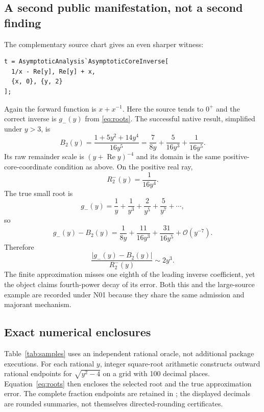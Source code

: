 \documentclass[11pt,letterpaper]{article}
\theoremstyle{remark}\newtheorem{remark}[theorem]{Remark}
\newcommand{\file}[1]{\path{#1}}
\newcommand{\OO}[1]{\mathcal O\!\left(#1\right)}
\begin{document}
\subsection{A second public manifestation, not a second finding}
The complementary source chart gives an even sharper witness:
\begin{lstlisting}
t = AsymptoticAnalysis`AsymptoticCoreInverse[
  1/x - Re[y], Re[y] + x,
  {x, 0}, {y, 2}
];
\end{lstlisting}
Again the forward function is $x+x^{-1}$. Here the source tends to $0^+$ and
the correct inverse is $g_-(y)$ from \eqref{eq:roots}. The successful native
result, simplified under $y>3$, is
\begin{equation}\label{eq:smallobserved}
 B_2(y)=\frac{1+5y^2+14y^4}{16y^5}
       =\frac7{8y}+\frac5{16y^3}+\frac1{16y^5}.
\end{equation}
Its raw remainder scale is $(y+\operatorname{Re}y)^{-4}$ and its domain is the
same positive-core-coordinate condition as above. On the positive real ray,
\begin{equation}\label{eq:smallscale}
 R_2^-(y)=\frac1{16y^4}.
\end{equation}
The true small root is
\[
 g_-(y)=\frac1y+\frac1{y^3}+\frac2{y^5}+\frac5{y^7}+\cdots,
\]
so
\begin{equation}\label{eq:smallerror}
 g_-(y)-B_2(y)=\frac1{8y}+\frac{11}{16y^3}
                    +\frac{31}{16y^5}+\OO{y^{-7}}.
\end{equation}
Therefore
\begin{equation}\label{eq:smallratio}
 \frac{|g_-(y)-B_2(y)|}{R_2^-(y)}\sim 2y^3.
\end{equation}
The finite approximation misses one eighth of the leading inverse coefficient,
yet the object claims fourth-power decay of its error. Both this and the
large-source example are recorded under N01 because they share the same
admission and majorant mechanism.

\subsection{Exact numerical enclosures}
Table~\ref{tab:samples} uses an independent rational oracle, not additional
package executions. For each rational $y$, integer square-root arithmetic
constructs outward rational endpoints for $\sqrt{y^2-4}$ on a grid with 100
decimal places. Equation~\eqref{eq:roots} then encloses the selected root and
the true approximation error. The complete fraction endpoints are retained in
\file{evidence/exact-enclosures.json}; the displayed decimals are rounded
summaries, not themselves directed-rounding certificates.
\end{document}
